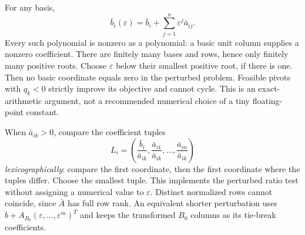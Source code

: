 \documentclass[11pt,a4paper]{article}
\begin{document}
For any basis,
\[
  \bar b_i(\varepsilon)=\bar b_i+\sum_{j=1}^n\varepsilon^j\bar a_{ij}.
\]
Every such polynomial is nonzero as a polynomial: a basic unit column supplies
a nonzero coefficient. There are finitely many bases and rows, hence only
finitely many positive roots. Choose $\varepsilon$ below their smallest positive
root, if there is one. Then no basic coordinate equals zero in the perturbed
problem. Feasible pivots with $q_k<0$ strictly improve its objective and cannot
cycle. This is an exact-arithmetic argument, not a recommended numerical choice
of a tiny floating-point constant.

When $\bar a_{ik}>0$, compare the coefficient tuples
\begin{equation}\label{eq:lex-tuple}
  L_i=\left(\frac{\bar b_i}{\bar a_{ik}},
  \frac{\bar a_{i1}}{\bar a_{ik}},\ldots,
  \frac{\bar a_{in}}{\bar a_{ik}}\right)
\end{equation}
\emph{lexicographically}: compare the first coordinate, then the first coordinate
where the tuples differ. Choose the smallest tuple. This implements the
perturbed ratio test without assigning a numerical value to $\varepsilon$.
Distinct normalized rows cannot coincide, since $\bar A$ has full row rank.
An equivalent shorter perturbation uses
$b+A_{B_0}(\varepsilon,\ldots,\varepsilon^m)^T$ and keeps the transformed
$B_0$ columns as its tie-break coefficients.

\end{document}
